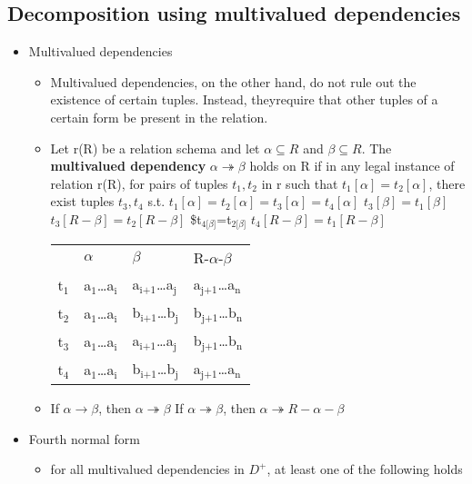 \documentclass[11pt]{article}
\begin{document}
\subsection{Decomposition using multivalued dependencies}
\label{sec-13-8}
\begin{itemize}
\item Multivalued dependencies
\begin{itemize}
\item Multivalued dependencies, on the other hand, do not rule out the existence of
certain tuples. Instead, theyrequire that other tuples of a certain form be present in
the relation.
\item Let r(R) be a relation schema and let $\alpha\subseteq R$ and $\beta\subseteq R$. The \textbf{multivalued dependency}
$\alpha\twoheadrightarrow\beta$
holds on R if in any legal instance of relation r(R), for pairs of tuples $t_1, t_2$ in r
such that $t_1[\alpha]=t_2[\alpha]$, there exist tuples $t_3,t_4$ s.t.
$t_1[\alpha]=t_2[\alpha]=t_3[\alpha]=t_4[\alpha]$
$t_3[\beta]=t_1[\beta]$
$t_3[R-\beta]=t_2[R-\beta]$
\$t$_{\text{4[}\beta\text{]}}$=t$_{\text{2[}\beta\text{]}}$
$t_4[R-\beta]=t_1[R-\beta]$
\begin{center}
\begin{tabular}{llll}
 & $\alpha$ & $\beta$ & R-$\alpha$-$\beta$\\
t$_{\text{1}}$ & a$_{\text{1}}$\ldots{}a$_{\text{i}}$ & a$_{\text{i+1}}$\ldots{}a$_{\text{j}}$ & a$_{\text{j+1}}$\ldots{}a$_{\text{n}}$\\
t$_{\text{2}}$ & a$_{\text{1}}$\ldots{}a$_{\text{i}}$ & b$_{\text{i+1}}$\ldots{}b$_{\text{j}}$ & b$_{\text{j+1}}$\ldots{}b$_{\text{n}}$\\
t$_{\text{3}}$ & a$_{\text{1}}$\ldots{}a$_{\text{i}}$ & a$_{\text{i+1}}$\ldots{}a$_{\text{j}}$ & b$_{\text{j+1}}$\ldots{}b$_{\text{n}}$\\
t$_{\text{4}}$ & a$_{\text{1}}$\ldots{}a$_{\text{i}}$ & b$_{\text{i+1}}$\ldots{}b$_{\text{j}}$ & a$_{\text{j+1}}$\ldots{}a$_{\text{n}}$\\
\end{tabular}
\end{center}
\item If $\alpha\to\beta$, then $\alpha\twoheadrightarrow\beta$
       If $\alpha\twoheadrightarrow\beta$, then $\alpha\twoheadrightarrow R-\alpha-\beta$
\end{itemize}
\item Fourth normal form
\begin{itemize}
\item for all multivalued dependencies in $D^+$, at least one of the following holds

\end{itemize}
\end{itemize}
\end{document}
